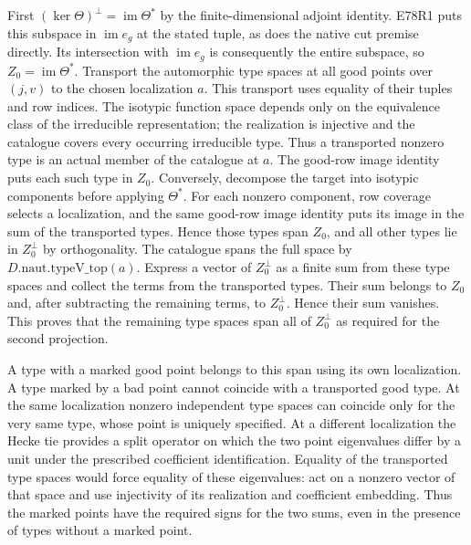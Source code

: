 First $(\ker\Theta)^\perp=\operatorname{im}\Theta^*$ by the
finite-dimensional adjoint identity. E78R1 puts this subspace
in $\operatorname{im}e_g$ at the stated tuple, as does the native
cut premise directly. Its intersection with $\operatorname{im}e_g$
is consequently the entire subspace, so $Z_0=\operatorname{im}\Theta^*$.
Transport the automorphic type
spaces at all good points over $(j,v)$ to the chosen localization
$a$. This transport uses equality of their tuples and row indices.
The isotypic function space depends only on the equivalence class
of the irreducible representation; the realization is injective and
the catalogue covers every occurring irreducible type. Thus a
transported nonzero type is an actual member of the catalogue at $a$.
The good-row image identity puts each such type in $Z_0$. Conversely,
decompose the target into isotypic components before applying
$\Theta^*$. For each nonzero component, row coverage selects a
localization, and the same good-row image identity puts its image
in the sum of the transported types. Hence those types span $Z_0$,
and all other types lie in $Z_0^\perp$ by orthogonality. The
catalogue spans the full space by $D.\mathrm{naut}.\mathrm{typeV\_top}(a)$.
Express a vector of $Z_0^\perp$ as a finite sum from these type
spaces and collect the terms from the transported types. Their
sum belongs to $Z_0$ and, after subtracting the remaining terms,
to $Z_0^\perp$. Hence their sum vanishes. This proves that the
remaining type spaces span all of $Z_0^\perp$ as required for the
second projection.

A type with a marked good point belongs to this span using its own
localization. A type marked by a bad point cannot coincide with a
transported good type. At the same localization nonzero independent
type spaces can coincide only for the very same type, whose point
is uniquely specified. At a different localization the Hecke tie
provides a split operator on which the two point eigenvalues differ
by a unit under the prescribed coefficient identification. Equality
of the transported type spaces would force equality of these
eigenvalues: act on a nonzero vector of that space and use
injectivity of its realization and coefficient embedding. Thus the
marked points have the required signs for the two sums, even in the
presence of types without a marked point.


